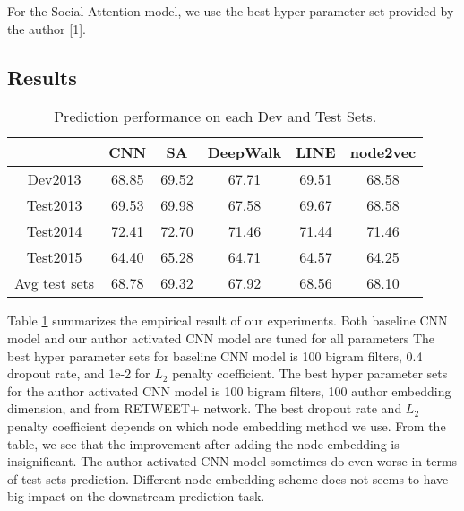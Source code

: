 For the Social Attention model, we use the best hyper parameter set provided by the author [1].


\subsection{Results}
\begin{table}[tbp]
\begin{center}
\begin{tabular}{|c|c| c | c c c |}
\hline
 & CNN & SA
\footnotemark
& DeepWalk & LINE & node2vec\\
\hline
Dev2013  & 68.85 &69.52 & 67.71 & 69.51 & 68.58 \\
\hline
Test2013  & 69.53 & 69.98& 67.58 & 69.67 & 68.58 \\
Test2014  & 72.41 & 72.70 & 71.46 & 71.44 & 71.46 \\
Test2015  & 64.40 &65.28 & 64.71 & 64.57 & 64.25 \\
\hline
Avg test sets & 68.78 &69.32& 67.92 & 68.56  & 68.10 \\
\hline
\end{tabular}
\end{center}
\caption{Prediction performance on each Dev and Test Sets. }
\label{Tb:Results}
\end{table}%



Table \ref{Tb:Results} summarizes the empirical result of our experiments. Both baseline CNN model 
and our author activated CNN model are tuned for all parameters The best hyper parameter sets for baseline 
CNN model is 100 bigram filters, 0.4 dropout rate, and 1e-2 for $L_2$ penalty coefficient. The best 
hyper parameter sets for the author activated CNN model is 100 bigram filters, 100 author embedding dimension, 
and from RETWEET+ network. The best dropout rate and $L_2$ penalty coefficient depends on which 
node embedding method we use. From the table, we see that the improvement after adding the node 
embedding is insignificant. The author-activated CNN model sometimes do even worse in terms of test 
sets prediction. Different node embedding scheme does not seems to have big impact on the downstream 
prediction task.





